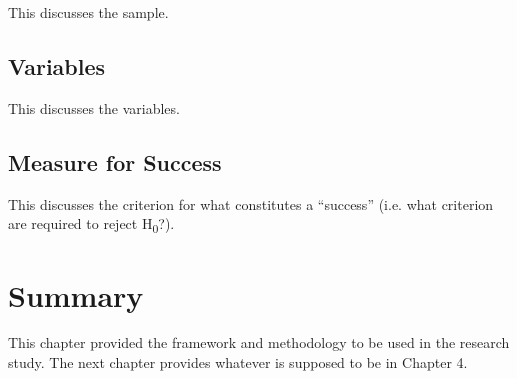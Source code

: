 This discusses the sample.


\subsection{Variables}

This discusses the variables.


\subsection{Measure for Success}

This discusses the criterion for what constitutes a ``success'' (i.e. what criterion are required to reject H\textsubscript{0}?).


\section{Summary}

This chapter provided the framework and methodology to be used in the research study.
The next chapter provides whatever is supposed to be in Chapter 4.
